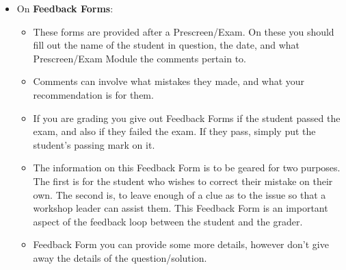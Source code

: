 \documentclass[12pt]{article}
\begin{document}
\begin{itemize}
\begin{itemize}
		\end{itemize}
	\item On \textbf{Feedback Forms}:
	\begin{itemize}
		\item These forms are provided after a Prescreen/Exam. On these you should fill out the name of the student in question, the date, and what Prescreen/Exam Module the comments pertain to.
		\item Comments can involve what mistakes they made, and what your recommendation is for them.
		\item If you are grading you give out Feedback Forms if the student passed the exam, and also if they failed the exam. If they pass, simply put the student's passing mark on it.
		\item The information on this Feedback Form is to be geared for two purposes. The first is for the student who wishes to correct their mistake on their own. The second is, to leave enough of a clue as to the issue so that a workshop leader can assist them. This Feedback Form is an important aspect of the feedback loop between the student and the grader.
		\item Feedback Form you can provide some more details, however don't give away the details of the question/solution. 
	\end{itemize}
\end{itemize}
\setlength{\headheight}{15pt}
\end{document}
